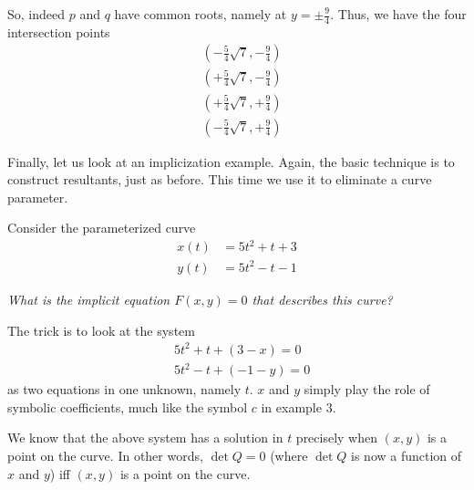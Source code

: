 \begin{numerical-example}
So, indeed $p$ and $q$ have common roots, namely at $y = \pm
\frac{9}{4}$. Thus, we have the four intersection points
\begin{align*}
  &(- \frac{5}{4}\sqrt{7}, -\frac{9}{4}) \\
  &(+ \frac{5}{4}\sqrt{7}, -\frac{9}{4}) \\
  &(+\frac{5}{4}\sqrt{7}, +\frac{9}{4}) \\
  &(-\frac{5}{4}\sqrt{7}, +\frac{9}{4})
\end{align*}

\end{numerical-example}

\begin{numerical-example}
  Finally, let us look at an implicization example. Again, the basic
  technique is to construct resultants, just as before. This time we
  use it to eliminate a curve parameter.

  Consider the parameterized curve
  \begin{align*}
    x(t) &= 5t^2 + t + 3 \\
    y(t) &= 5t^2 - t - 1
  \end{align*}

  \textit{What is the implicit equation $F(x, y) = 0$ that describes
    this curve?}

  The trick is to look at the system
  \begin{align*}
    &5t^2 + t + (3 - x) = 0 \\
    &5t^2 - t + (-1 -y) = 0
  \end{align*}
  as two equations in one unknown, namely $t$. $x$ and $y$ simply play
  the role of symbolic coefficients, much like the symbol $c$ in
  example 3. 

  We know that the above system has a solution in $t$ precisely when
  $(x, y)$ is a point on the curve. In other words, $\det Q = 0$
  (where $\det Q$ is now a function of $x$ and $y$) iff $(x, y)$ is a
  point on the curve.


\end{numerical-example}
